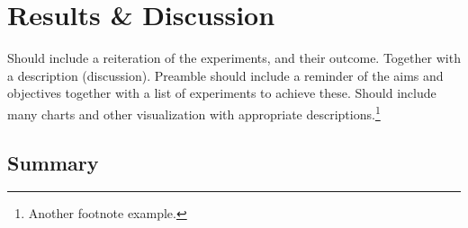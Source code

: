 \chapter{Results \& Discussion}
Should include a reiteration of the experiments, and their outcome.  Together with a description (discussion).  Preamble should include a reminder of the aims and objectives together with a list of experiments to achieve these.  Should include many charts and other visualization with appropriate descriptions.\footnote{Another footnote example.}  

\blindtext

\section{Summary}
